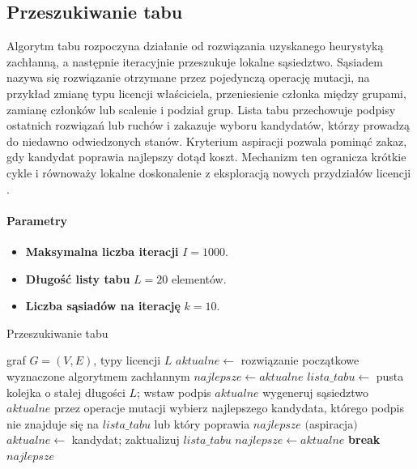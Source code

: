 \subsection{Przeszukiwanie tabu}\label{subsec:tabu}
Algorytm tabu rozpoczyna działanie od rozwiązania uzyskanego heurystyką zachłanną, a następnie iteracyjnie przeszukuje lokalne sąsiedztwo. Sąsiadem nazywa się rozwiązanie otrzymane przez pojedynczą operację mutacji, na przykład zmianę typu licencji właściciela, przeniesienie członka między grupami, zamianę członków lub scalenie i podział grup. Lista tabu przechowuje podpisy ostatnich rozwiązań lub ruchów i zakazuje wyboru kandydatów, którzy prowadzą do niedawno odwiedzonych stanów. Kryterium aspiracji pozwala pominąć zakaz, gdy kandydat poprawia najlepszy dotąd koszt. Mechanizm ten ogranicza krótkie cykle i równoważy lokalne doskonalenie z eksploracją nowych przydziałów licencji \cite{glover1989}.

\paragraph{Parametry}
\begin{itemize}
  \item \textbf{Maksymalna liczba iteracji} \(I=1000\).
  \item \textbf{Długość listy tabu} \(L=20\) elementów.
  \item \textbf{Liczba sąsiadów na iterację} \(k=10\).
\end{itemize}

\begin{algorithm}[H]
  \caption{Przeszukiwanie tabu}\label{alg:tabu}
  \begin{algorithmic}[1]
    \Require graf \(G=(V,E)\), typy licencji \( L\)
    \State \(aktualne \gets\) rozwiązanie początkowe wyznaczone algorytmem zachłannym
    \State \(najlepsze \gets aktualne\)
    \State \(lista\_tabu \gets\) pusta kolejka o stałej długości \(L\); wstaw podpis \(aktualne\)
    \State wygeneruj sąsiedztwo \(aktualne\) przez operacje mutacji
    \State wybierz najlepszego kandydata, którego podpis nie znajduje się na \(lista\_tabu\) lub który poprawia \(najlepsze\) \((\)aspiracja\()\)
    \State \(aktualne \gets\) kandydat; zaktualizuj \(lista\_tabu\)
     \State \(najlepsze \gets aktualne\) \EndIf
    \Else
    \State \textbf{break}
    \EndIf
    \EndFor
    \State \Return \(najlepsze\)
  \end{algorithmic}
\end{algorithm}

